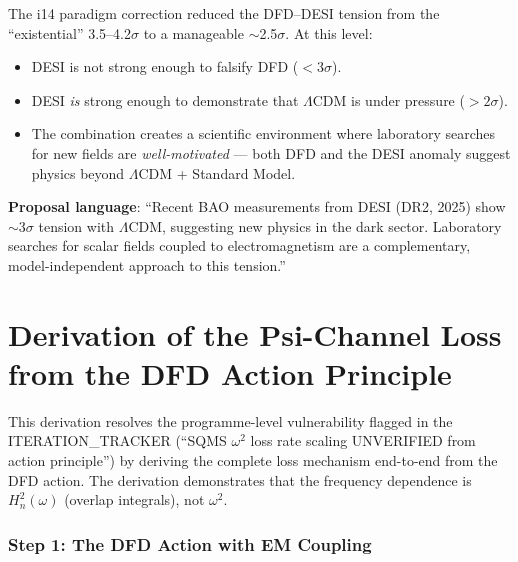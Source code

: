 \documentclass[11pt]{article}
\newcommand{\Heff}{H_n}
\theoremstyle{definition}
\theoremstyle{remark}
\begin{document}
\begin{tcolorbox}[colback=blue!5!white, colframe=blue!60!black,
  title=\textbf{W4i15 TOP 5 FINDINGS --- Ranked by Programme Impact}]
\begin{enumerate}
The i14 paradigm correction reduced the DFD--DESI tension from the
``existential'' 3.5--4.2$\sigma$ to a manageable $\sim$2.5$\sigma$.
At this level:
\begin{itemize}[nosep]
\item DESI is not strong enough to falsify DFD ($<3\sigma$).
\item DESI \emph{is} strong enough to demonstrate that $\Lambda$CDM
  is under pressure ($>2\sigma$).
\item The combination creates a scientific environment where
  laboratory searches for new fields are \emph{well-motivated} ---
  both DFD and the DESI anomaly suggest physics beyond
  $\Lambda$CDM + Standard Model.
\end{itemize}

\textbf{Proposal language}: ``Recent BAO measurements from DESI
(DR2, 2025) show $\sim$3$\sigma$ tension with $\Lambda$CDM,
suggesting new physics in the dark sector. Laboratory searches
for scalar fields coupled to electromagnetism are a
complementary, model-independent approach to this tension.''

\end{enumerate}
\end{tcolorbox}


\part{Derivation of the Psi-Channel Loss from the DFD Action Principle}
\label{part:derivation}

This derivation resolves the programme-level vulnerability flagged in
the ITERATION\_TRACKER (``SQMS $\omega^2$ loss rate scaling UNVERIFIED
from action principle'') by deriving the complete loss mechanism
end-to-end from the DFD action. The derivation demonstrates that the
frequency dependence is $\Heff^2(\omega)$ (overlap integrals), not
$\omega^2$.


\section{Step 1: The DFD Action with EM Coupling}
\label{sec:step1}
\end{document}
